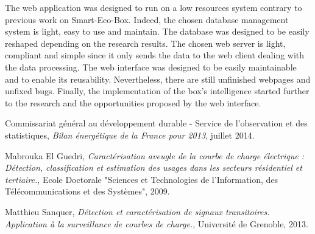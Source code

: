 The web application was designed to run on a low resources system contrary to previous work on Smart-Eco-Box. Indeed, the chosen database management system is light, easy to use and maintain. The database was designed to be easily reshaped depending on the research results. The chosen web server is light, compliant and simple since it only sends the data to the web client dealing with the data processing. The web interface was designed to be easily maintainable and to enable its reusability. Nevertheless, there are still unfinished webpages and unfixed bugs. Finally, the implementation of the box's intelligence started further to the research and the opportunities proposed by the web interface.

\begin{thebibliography}{10}
 Commissariat g\'en\'eral au d\'eveloppement durable - Service de l'observation et des statistiques, \emph{Bilan \'energ\'etique de la France pour 2013}, juillet 2014.
 
    Mabrouka El Guedri, \emph{Caract\'erisation aveugle de la courbe de charge \'electrique : D\'etection, classification et estimation des usages dans les secteurs r\'esidentiel et tertiaire.}, Ecole Doctorale "Sciences et Technologies de l'Information, des T\'el\'ecommunications et des Syst\`emes", 2009.
 
    Matthieu Sanquer, \textit{D\'etection et caract\'erisation de signaux transitoires. Application \`a la surveillance de courbes de charge.}, Universit\'e de Grenoble, 2013.
\end{thebibliography}